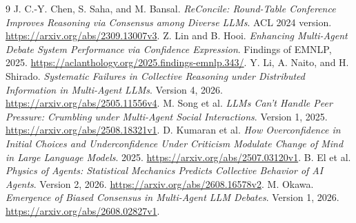 \documentclass[11pt]{article}
\begin{document}
\begin{thebibliography}{9}
 J. C.-Y. Chen, S. Saha, and M. Bansal.
\emph{ReConcile: Round-Table Conference Improves Reasoning via Consensus among Diverse LLMs}. ACL 2024 version.
\url{https://arxiv.org/abs/2309.13007v3}.
 Z. Lin and B. Hooi.
\emph{Enhancing Multi-Agent Debate System Performance via Confidence Expression}. Findings of EMNLP, 2025.
\url{https://aclanthology.org/2025.findings-emnlp.343/}.
 Y. Li, A. Naito, and H. Shirado.
\emph{Systematic Failures in Collective Reasoning under Distributed Information in Multi-Agent LLMs}. Version 4, 2026.
\url{https://arxiv.org/abs/2505.11556v4}.
 M. Song et al.
\emph{LLMs Can't Handle Peer Pressure: Crumbling under Multi-Agent Social Interactions}. Version 1, 2025.
\url{https://arxiv.org/abs/2508.18321v1}.
 D. Kumaran et al.
\emph{How Overconfidence in Initial Choices and Underconfidence Under Criticism Modulate Change of Mind in Large Language Models}. 2025.
\url{https://arxiv.org/abs/2507.03120v1}.
 B. El et al.
\emph{Physics of Agents: Statistical Mechanics Predicts Collective Behavior of AI Agents}. Version 2, 2026.
\url{https://arxiv.org/abs/2608.16578v2}.
 M. Okawa.
\emph{Emergence of Biased Consensus in Multi-Agent LLM Debates}. Version 1, 2026.
\url{https://arxiv.org/abs/2608.02827v1}.
\end{thebibliography}
\end{document}
